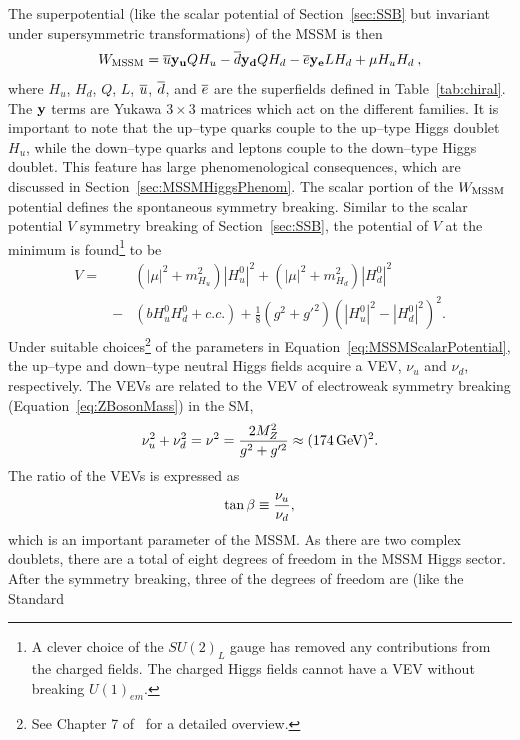 The superpotential (like the scalar potential of Section~\ref{sec:SSB} but
invariant under supersymmetric transformations) of the MSSM is
then~\cite{Martin:1997um}
\begin{equation}
  W_{\rm MSSM} =
  \overline u {\bf y_u} Q H_u -
  \overline d {\bf y_d} Q H_d -
  \overline e {\bf y_e} L H_d +
  \mu H_u H_d \>,
  \nonumber
\end{equation}
where $H_u$, $H_d$, $Q$, $L$, $\overline u$, $\overline d$, and $\overline e$ are the
superfields defined in Table~\ref{tab:chiral}.  The ${\bf y}$ terms are Yukawa
$3 \times 3$ matrices which act on the different families.  It is important to
note that the up--type quarks couple to the up--type Higgs doublet $H_u$, while the
down--type quarks and leptons couple to the down--type Higgs doublet.  This feature has
large phenomenological consequences, which are discussed
in Section~\ref{sec:MSSMHiggsPhenom}.  The scalar portion of the $W_{\rm MSSM}$
potential defines the spontaneous symmetry breaking.  Similar to the scalar
potential $V$ symmetry breaking of Section~\ref{sec:SSB}, the potential of $V$
at the minimum is found\footnote{A clever choice of the $SU(2)_L$ gauge has
removed any contributions from the charged fields.  The charged Higgs fields
cannot have a VEV without breaking $U(1)_{em}$.} to be 
\begin{eqnarray}
  V =& &(|\mu|^2 + m^2_{H_u})|H^0_u|^2 + (|\mu|^2 + m^2_{H_d})|H^0_d|^2
  \nonumber \\ 
   &- &(b H^0_u H^0_d + c.c.) + \frac{1}{8}(g^2 + g'^2)(|H^0_u|^2 - |H^0_d|^2)^2.
  \label{eq:MSSMScalarPotential}
\end{eqnarray}
Under suitable choices\footnote{See Chapter 7 of~\cite{Martin:1997um} for a
detailed overview.} of the parameters in Equation~\ref{eq:MSSMScalarPotential},
the up--type and down--type neutral Higgs fields acquire a VEV, $\nu_u$ and
$\nu_d$, respectively.  The VEVs are related to the VEV of electroweak
symmetry breaking (Equation~\ref{eq:ZBosonMass}) in the SM,
\begin{equation}
  \nu_u^2 + \nu_d^2 = \nu^2 = \frac{2 M_Z^2}{g^2 + g'^2} \approx (174 \,\text{Ge\hspace{-.08em}V})^2.
  \nonumber
\end{equation}
The ratio of the VEVs is expressed as
\begin{equation}
  \tan\beta \equiv \frac{\nu_u}{\nu_d},
  \nonumber
\end{equation}
which is an important parameter of the MSSM\@.  As there are two complex doublets,
there are a total of eight degrees of freedom in the MSSM Higgs sector.  After
the symmetry breaking, three of the degrees of freedom are (like the Standard
